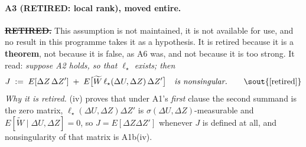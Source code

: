 \paragraph{A3 (RETIRED: local rank), moved entire.}

\begin{assumption}\label{ass:rank}
\textbf{\sout{RETIRED.}} This assumption is not maintained, it is not available for use, and no
result in this programme takes it as a hypothesis. It is retired because it is a \textbf{theorem}, not
because it is false, as A6 was, and not because it is too strong. It read: \emph{suppose
A2 holds, so that $\ell_\star$ exists; then}
\[
J \;:=\; E[\Delta Z\,\Delta Z'] \;+\; E\big[\widetilde W\,\ell_\star(\Delta U,\Delta Z)\,\Delta Z'\big]
\quad\text{\emph{is nonsingular.}}
\qquad\text{\sout{[retired]}}
\]
\emph{Why it is retired.} \textup{(iv)} proves that under A1's \emph{first} clause the
second summand is the zero matrix, $\ell_\star(\Delta U,\Delta Z)\Delta Z'$ is
$\sigma(\Delta U,\Delta Z)$-measurable and $E[\widetilde W\mid\Delta U,\Delta Z]=0$, so
$J=E[\Delta Z\Delta Z']$ whenever $J$ is defined at all, and nonsingularity of that matrix is A1b(iv).

\end{assumption}
